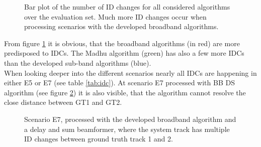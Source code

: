 \begin{figure}[!ht]
	\centering
		\def\svgwidth{0.6\linewidth}
		  \small
		\caption{Bar plot of the number of ID changes for all considered algorithms over the evaluation set. Much more ID changes occur when processing scenarios with the developed broadband algorithms.}
		\label{fig:results_idc}
\end{figure}
From figure \ref{fig:results_idc} it is obvious, that the broadband algorithms (in red) are more predisposed to \acp{IDC}. The Madhu algorithm (green) has also a few more \acp{IDC} than the developed sub-band algorithms (blue).\\
When looking deeper into the different scenarios nearly all \acp{IDC} are happening in either E5 or E7 (see table \ref{tab:idc}). At scenario E7 processed with BB \ac{DS} algorithm (see figure \ref{fig:results_idc_ex1}) it is also visible, that the algorithm cannot resolve the close distance between GT1 and GT2. \\
\begin{figure}[!ht]
		\centering
		\def\svgwidth{1\linewidth}
		\small
		\caption{Scenario E7, processed with the developed broadband algorithm and a delay and sum beamformer, where the system track has multiple ID changes between ground truth track 1 and 2.}
		\label{fig:results_idc_ex1}
\end{figure}

